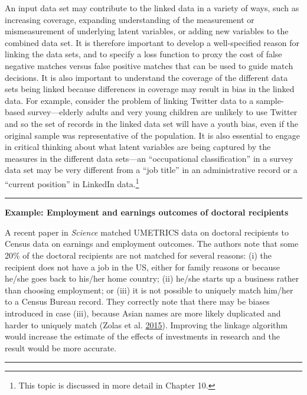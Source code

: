 \documentclass[]{krantz}
\begin{document}
An input data set may contribute to the linked data in a variety of
ways, such as increasing coverage, expanding understanding of the
measurement or mismeasurement of underlying latent variables, or adding
new variables to the combined data set. It is therefore important to
develop a well-specified reason for linking the data sets, and to
specify a loss function to proxy the cost of false negative matches
versus false positive matches that can be used to guide match decisions.
It is also important to understand the coverage of the different data
sets being linked because differences in coverage may result in bias in
the linked data. For example, consider the problem of linking Twitter
data to a sample-based survey---elderly adults and very young children
are unlikely to use Twitter and so the set of records in the linked data
set will have a youth bias, even if the original sample was
representative of the population. It is also essential to engage in
critical thinking about what latent variables are being captured by the
measures in the different data sets---an ``occupational classification''
in a survey data set may be very different from a ``job title'' in an
administrative record or a ``current position'' in LinkedIn
data.\footnote{This topic is discussed in more detail in Chapter 10.}

\begin{center}\rule{0.5\linewidth}{\linethickness}\end{center}

\textbf{Example: Employment and earnings outcomes of doctoral
recipients}

A recent paper in \emph{Science} matched UMETRICS data on doctoral
recipients to Census data on earnings and employment outcomes. The
authors note that some 20\% of the doctoral recipients are not matched
for several reasons: (i) the recipient does not have a job in the US,
either for family reasons or because he/she goes back to his/her home
country; (ii) he/she starts up a business rather than choosing
employment; or (iii) it is not possible to uniquely match him/her to a
Census Bureau record. They correctly note that there may be biases
introduced in case (iii), because Asian names are more likely duplicated
and harder to uniquely match (Zolas et al.
\protect\hyperlink{ref-zolas2015wrapping}{2015}). Improving the linkage
algorithm would increase the estimate of the effects of investments in
research and the result would be more accurate.

\begin{center}\rule{0.5\linewidth}{\linethickness}\end{center}
\end{document}

